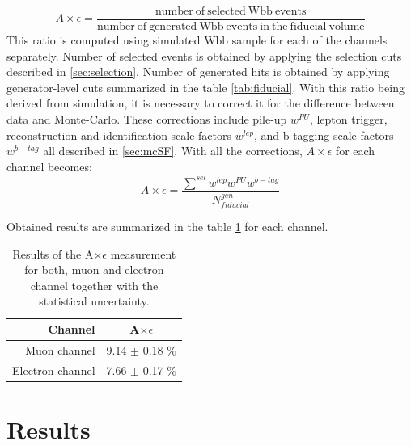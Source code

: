\begin{equation}
A\times \epsilon=\frac{\mathrm{number\ of\ selected\ Wbb\ events}}{\mathrm{number\ of\ generated\ Wbb\ events\ in\ the\ fiducial\ volume}}
\end{equation}
This ratio is computed using simulated Wbb sample for each of the channels separately. Number of selected events is obtained by applying the selection cuts described in \ref{sec:selection}. Number of generated hits is obtained by applying generator-level cuts summarized in the table \ref{tab:fiducial}. With this ratio being derived from simulation, it is necessary to correct it for the difference between data and Monte-Carlo. These corrections include pile-up  $w^{PU}$, lepton trigger, reconstruction and identification scale factors $w^{lep}$, and b-tagging scale factors $w^{b-tag}$ all described in \ref{sec:mcSF}. With all the corrections, $A\times \epsilon$ for each channel becomes:
\begin{equation}
A\times \epsilon = \frac{\sum^{sel} w^{lep} w^{PU} w^{b-tag}}{N_{fiducial}^{gen}}
\end{equation}

Obtained results are summarized in the table \ref{tab:AE} for each channel.

\begin{table}[!htb]
\begin{center}
   \begin{tabular} {r c} \hline \hline
        Channel         & A$\times \epsilon$ \\
        \hline
        Muon channel         & 9.14 $\pm$ 0.18 $\%$ \\
        Electron channel     & 7.66 $\pm$ 0.17 $\%$ \\
        \hline\hline
   \end{tabular}
\caption{Results of the A$\times \epsilon$ measurement for both, muon and electron channel together with the statistical uncertainty.}
\label{tab:AE}
\end{center}
\end{table}




\section{Results}
\label{sec:res}

